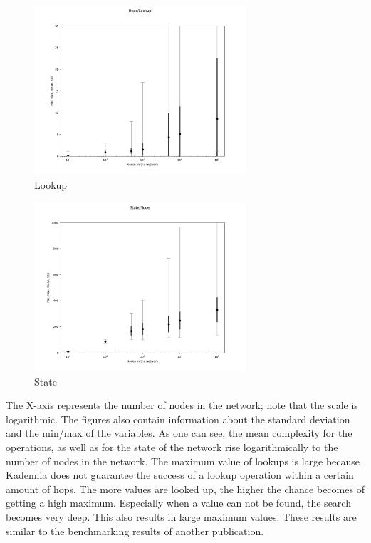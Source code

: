 \documentclass[a4paper, 12pt]{article} %
\begin{document}
\begin{figure}[ht]
    \caption{Lookup}
    \centering
    \includegraphics[width=0.70\textwidth]{images/lookup_figure.png}
\end{figure}

\begin{figure}[ht]
    \caption{State}
    \centering
    \includegraphics[width=0.70\textwidth]{images/state_figure.png}
\end{figure}

The X-axis represents the number of nodes in the network; note that the scale is logarithmic. The figures also contain information about the standard deviation and the min/max of the variables. As one can see, the mean complexity for the operations, as well as for the state of the network rise logarithmically to the number of nodes in the network. The maximum value of lookups is large because Kademlia does not guarantee the success of a lookup operation within a certain amount of hops. The more values are looked up, the higher the chance becomes of getting a high maximum. Especially when a value can not be found, the search becomes very deep. This also results in large maximum values. These results are similar to the benchmarking results of another publication\cite{Kovacevic2008}.
\end{document}

